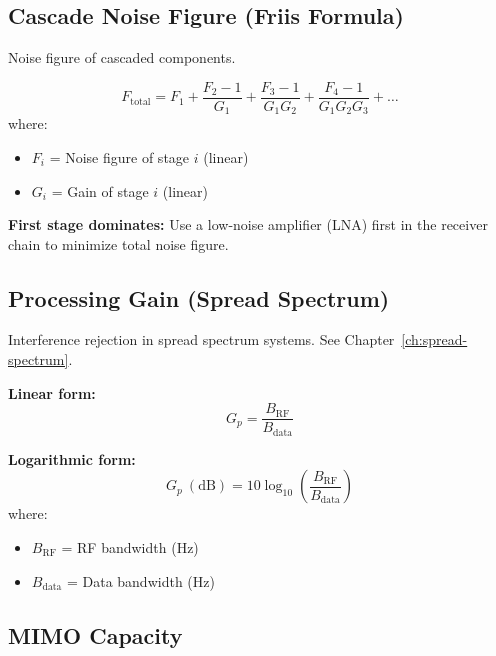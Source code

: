\subsection{Cascade Noise Figure (Friis Formula)}
\label{sec:cascade-nf}

Noise figure of cascaded components.

\begin{equation}
F_{\text{total}} = F_1 + \frac{F_2 - 1}{G_1} + \frac{F_3 - 1}{G_1 G_2} + \frac{F_4 - 1}{G_1 G_2 G_3} + \ldots
\label{eq:cascade-nf}
\end{equation}
where:
\begin{itemize}
\item $F_i$ = Noise figure of stage $i$ (linear)
\item $G_i$ = Gain of stage $i$ (linear)
\end{itemize}

\begin{keyconcept}
\textbf{First stage dominates:} Use a low-noise amplifier (LNA) first in the receiver chain to minimize total noise figure.
\end{keyconcept}

\subsection{Processing Gain (Spread Spectrum)}
\label{sec:processing-gain}

Interference rejection in spread spectrum systems. See Chapter~\ref{ch:spread-spectrum}.

\textbf{Linear form:}
\begin{equation}
G_p = \frac{B_{\text{RF}}}{B_{\text{data}}}
\label{eq:processing-gain}
\end{equation}

\textbf{Logarithmic form:}
\begin{equation}
G_p\ (\text{dB}) = 10\log_{10}\left(\frac{B_{\text{RF}}}{B_{\text{data}}}\right)
\label{eq:processing-gain-db}
\end{equation}
where:
\begin{itemize}
\item $B_{\text{RF}}$ = RF bandwidth (Hz)
\item $B_{\text{data}}$ = Data bandwidth (Hz)
\end{itemize}

\subsection{MIMO Capacity}
\label{sec:mimo-capacity}

